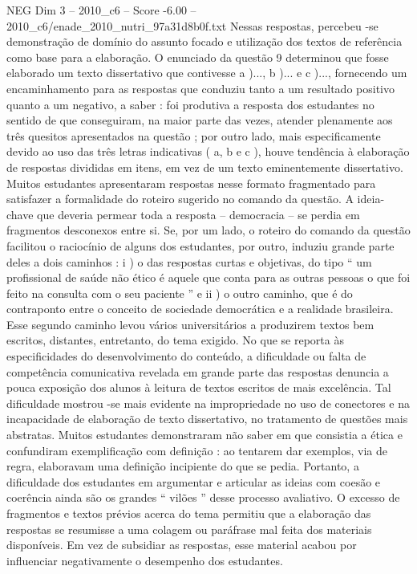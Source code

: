 \begin{textsample}{NEG Dim 3 – 2010\_c6 – Score -6.00 – 2010\_c6/enade\_2010\_nutri\_97a31d8b0f.txt}
Nessas respostas, percebeu -se demonstração de domínio do assunto focado e utilização dos textos de referência como base para a elaboração.
O enunciado da questão 9 determinou que fosse elaborado um texto dissertativo que contivesse a )..., b )... e c )..., fornecendo um encaminhamento para as respostas que conduziu tanto a um resultado positivo quanto a um negativo, a saber : foi produtiva a resposta dos estudantes no sentido de que conseguiram, na maior parte das vezes, atender plenamente aos três quesitos apresentados na questão ; por outro lado, mais especificamente devido ao uso das três letras indicativas ( a, b e c ), houve tendência à elaboração de respostas divididas em itens, em vez de um texto eminentemente dissertativo.
Muitos estudantes apresentaram respostas nesse formato fragmentado para satisfazer a formalidade do roteiro sugerido no comando da questão.
A ideia-chave que deveria permear toda a resposta – democracia – se perdia em fragmentos desconexos entre si.
Se, por um lado, o roteiro do comando da questão facilitou o raciocínio de alguns dos estudantes, por outro, induziu grande parte deles a dois caminhos : i ) o das respostas curtas e objetivas, do tipo “ um profissional de saúde não ético é aquele que conta para as outras pessoas o que foi feito na consulta com o seu paciente ” e ii ) o outro caminho, que é do contraponto entre o conceito de sociedade democrática e a realidade brasileira.
Esse segundo caminho levou vários universitários a produzirem textos bem escritos, distantes, entretanto, do tema exigido.
No que se reporta às especificidades do desenvolvimento do conteúdo, a dificuldade ou falta de competência comunicativa revelada em grande parte das respostas denuncia a pouca exposição dos alunos à leitura de textos escritos de mais excelência.
Tal dificuldade mostrou -se mais evidente na impropriedade no uso de conectores e na incapacidade de elaboração de texto dissertativo, no tratamento de questões mais abstratas.
Muitos estudantes demonstraram não saber em que consistia a ética e confundiram exemplificação com definição : ao tentarem dar exemplos, via de regra, elaboravam uma definição incipiente do que se pedia.
Portanto, a dificuldade dos estudantes em argumentar e articular as ideias com coesão e coerência ainda são os grandes “ vilões ” desse processo avaliativo.
O excesso de fragmentos e textos prévios acerca do tema permitiu que a elaboração das respostas se resumisse a uma colagem ou paráfrase mal feita dos materiais disponíveis.
Em vez de subsidiar as respostas, esse material acabou por influenciar negativamente o desempenho dos estudantes.

\end{textsample}
